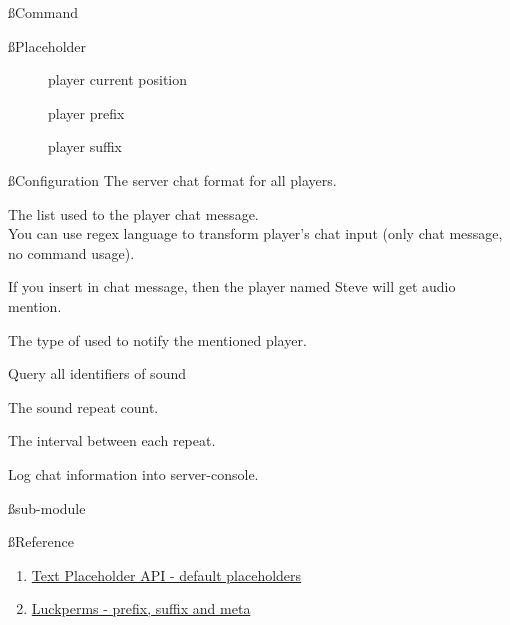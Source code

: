 \ss{Command}

\ss{Placeholder}
\begin{description}
    \item[] player current position
    \item[] player prefix
    \item[] player suffix
\end{description}

\ss{Configuration}
The server chat format for all players.

The  list used to  the player chat message.
\\
You can use regex language to transform player's chat input (only chat message, no command usage).

If you insert  in chat message, then the player named Steve will get audio mention.

The type of  used to notify the mentioned player.
\begin{tips}{Query all identifiers of sound}
\end{tips}


The sound repeat count.

The interval between each repeat.

Log chat information into server-console.

\ss{sub-module}



\ss{Reference}
\begin{enumerate}
    \item \href{https://placeholders.pb4.eu/user/default-placeholders/}{Text Placeholder API - default placeholders}
    \item \href{https://luckperms.net/wiki/Prefixes,-Suffixes-&-Meta}{Luckperms - prefix, suffix and meta}
\end{enumerate}